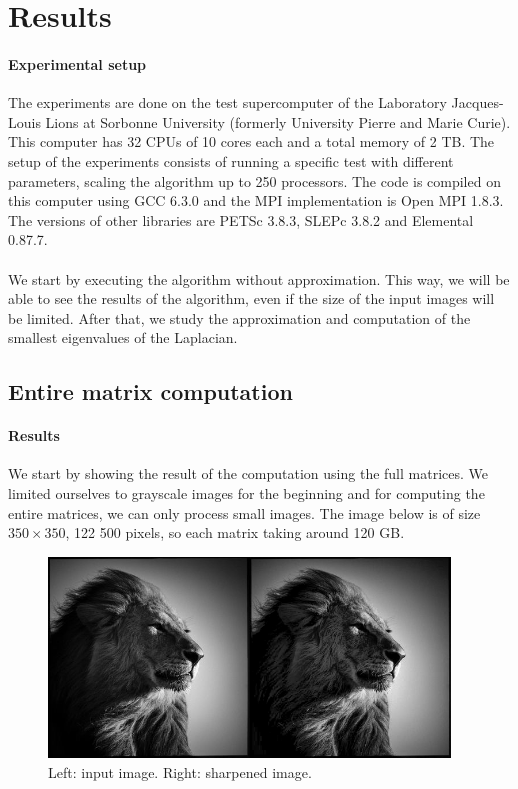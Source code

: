 \section{Results}

\paragraph{Experimental setup}
The experiments are done on the test supercomputer of the Laboratory Jacques-Louis Lions at Sorbonne University (formerly University Pierre and Marie Curie).
This computer has 32 CPUs of 10 cores each and a total memory of 2 TB.
The setup of the experiments consists of running a specific test with different parameters, scaling the algorithm up to 250 processors.
The code is compiled on this computer using GCC 6.3.0 and the MPI implementation is Open MPI 1.8.3.
The versions of other libraries are PETSc 3.8.3, SLEPc 3.8.2 and Elemental 0.87.7.

\paragraph{}
We start by executing the algorithm without approximation.
This way, we will be able to see the results of the algorithm, even if the size of the input images will be limited.
After that, we study the approximation and computation of the smallest eigenvalues of the Laplacian.

\subsection{Entire matrix computation}

\paragraph{Results}
We start by showing the result of the computation using the full matrices.
We limited ourselves to grayscale images for the beginning and for computing the entire matrices, we can only process small images.
The image below is of size \(350 \times 350\), 122 500 pixels, so each matrix taking around 120 GB.

\begin{figure}[H]
  \centering
  \includegraphics[width=0.95\textwidth]{img/lion.png}
  \caption{Left: input image. Right: sharpened image.}
\end{figure}

